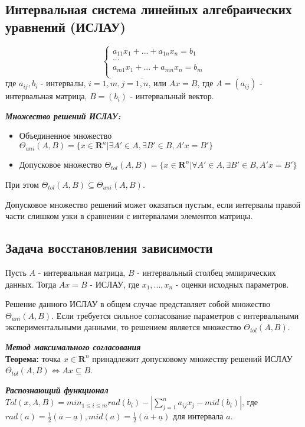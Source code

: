 \documentclass[12pt,a4paper]{article}
\begin{document}
\subsection{Интервальная система линейных алгебраических уравнений (ИСЛАУ)}
\begin{equation}
    \left\{
    \begin{array}{ll}
        a_{11}x_1+...+a_{1n}x_n=b_1\\
        ...\\
        a_{m1}x_1+...+a_{mn}x_n=b_m\\
    \end{array}
    \right.
\end{equation}
где $a_{ij},b_i$ - интервалы, $i=\overline{1,m},j=\overline{1,n}$, или $Ax=B$, где $A=(a_{ij})$ - интервальная матрица, $B=(b_i)$ - интервальный вектор.

\textbf{\textit{Множество решений ИСЛАУ:}}
\begin{itemize}
    \item Объединенное множество $\Theta_{uni}(A,B)=\{x\in{\mathbf{R}^n}|\exists{A'}\in{A},\exists{B'}\in{B},A'x=B'\}$
    \item Допусковое множество $\Theta_{tol}(A,B)=\{x\in{\mathbf{R}^n}|\forall{A'}\in{A},\exists{B'}\in{B},A'x=B'\}$
\end{itemize}
При этом $\Theta_{tol}(A,B)\subseteq{\Theta_{uni}(A,B)}$.

Допусковое множество решений может оказаться пустым, если интервалы правой части слишком узки в сравнении с интервалами элементов матрицы.

\subsection{Задача восстановления зависимости}
Пусть $A$ - интервальная матрица, $B$ - интервальный столбец эмпирических данных. Тогда $Ax=B$ - ИСЛАУ, где $x_1,...,x_n$ - оценки исходных параметров.

Решение данного ИСЛАУ в общем случае представляет собой множество $\Theta_{uni}(A,B)$. Если требуется сильное согласование параметров с интервальными экспериментальными данными, то решением является множество $\Theta_{tol}(A,B)$.

\textbf{\textit{Метод максимального согласования}}\\
\textbf{Теорема:} точка $x\in{\mathbf{R}^n}$ принадлежит допусковому множеству решений ИСЛАУ $\Theta_{tol}(A,B)\Longleftrightarrow{Ax\subseteq{B}}$.

\textbf{\textit{Распознающий функционал}}\\ $Tol(x,A,B)=min_{1\leq{i}\leq{m}}{rad(b_i)}-|\sum_{j=1}^na_{ij}x_j-mid(b_i)|$, где $rad(a)=\frac{1}{2}(\overline{a}-\underline{a}),mid(a)=\frac{1}{2}(\overline{a}+\underline{a})$ для интервала $a$.
\end{document}
